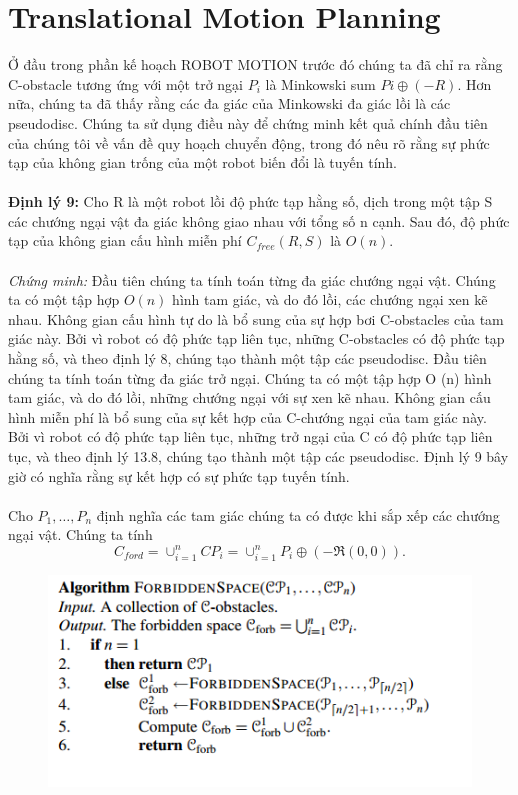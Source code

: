 \documentclass[a4paper,12pt]{report}
\begin{document}
\section{Translational Motion Planning}
Ở đầu trong phần kế hoạch ROBOT MOTION trước đó chúng ta đã chỉ ra rằng C-obstacle tương ứng với một trở ngại $P_i$ là Minkowski sum $Pi \oplus (-R)$. Hơn nữa, chúng ta đã thấy rằng các đa giác của Minkowski đa giác lồi là các pseudodisc. Chúng ta sử dụng điều này để chứng minh kết quả chính đầu tiên của chúng tôi về vấn đề quy hoạch chuyển động, trong đó nêu rõ rằng sự phức tạp của không gian trống của một robot biến đổi là tuyến tính. \\ \\
\textbf{Định lý 9: }Cho R là một robot lồi độ phức tạp hằng số, dịch trong một tập S các chướng ngại vật đa giác không giao nhau với tổng số n cạnh. Sau đó, độ phức tạp của không gian cấu hình miễn phí $C_{free}(R, S)$ là $O(n)$. \\ \\
\textit{Chứng minh: }Đầu tiên chúng ta tính toán từng đa giác chướng ngại vật. Chúng ta có một tập hợp $O (n)$ hình tam giác, và do đó lồi, các chướng ngại xen kẽ nhau. Không gian cấu hình tự do là bổ sung của sự hợp bơi C-obstacles của tam giác này. Bởi vì robot có độ phức tạp liên tục, những C-obstacles có độ phức tạp hằng số, và theo định lý 8, chúng tạo thành một tập các pseudodisc. Đầu tiên chúng ta tính toán từng đa giác trở ngại. Chúng ta có một tập hợp O (n) hình tam giác, và do đó lồi, những chướng ngại với sự xen kẽ nhau. Không gian cấu hình miễn phí là bổ sung của sự kết hợp của C-chướng ngại của tam giác này. Bởi vì robot có độ phức tạp liên tục, những trở ngại của C có độ phức tạp liên tục, và theo định lý 13.8, chúng tạo thành một tập các pseudodisc. Định lý 9 bây giờ có nghĩa rằng sự kết hợp có sự phức tạp tuyến tính. \\ \\
Cho $P_1, \ldots , P_n$ định nghĩa các tam giác chúng ta có được khi sắp xếp các chướng ngại vật. Chúng ta tính
\begin{displaymath}
C_{ford} = \cup_{i = 1}^nCP_i = \cup_{i = 1}^nP_i \oplus(-\Re(0,0)).
\end{displaymath}
\begin{figure}[h]
\includegraphics[width=0.7\linewidth]{ag2.png}
\end{figure}
\end{document}
